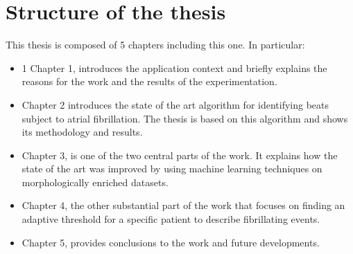 \section{Structure of the thesis}
This thesis is composed of 5 chapters including this one. In particular:
\begin{itemize}
\item1 Chapter 1, introduces the application context and briefly explains the reasons for the work and the results of the experimentation.
\item Chapter 2 introduces the state of the art algorithm for identifying beats subject to atrial fibrillation. The thesis is based on this algorithm and shows its methodology and results.
\item Chapter 3, is one of the two central parts of the work. It explains how the state of the art was improved by using machine learning techniques on morphologically enriched datasets.
\item Chapter 4, the other substantial part of the work that focuses on finding an adaptive threshold for a specific patient to describe fibrillating events.
\item Chapter 5, provides conclusions to the work and future developments.
\end{itemize}
\clearpage